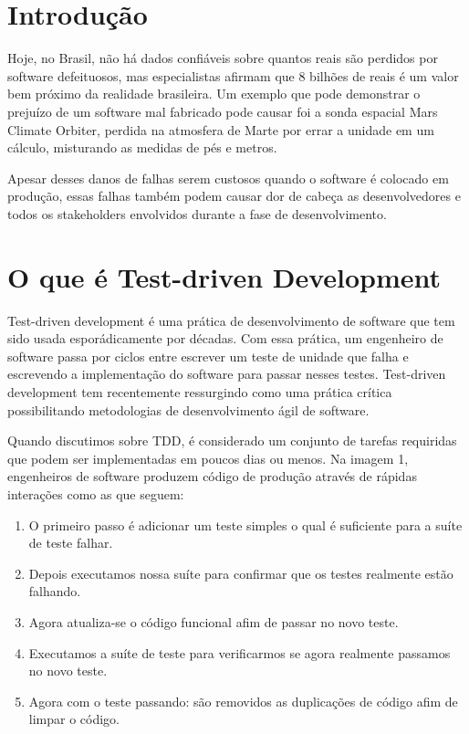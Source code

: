 \documentclass[12pt]{article}
\begin{document}
  \clearpage

  \renewcommand*\contentsname{Sumário}

  \tableofcontents

  \clearpage

  \section{Introdução}

  Hoje, no Brasil, não há dados confiáveis sobre quantos reais são perdidos por
  software defeituosos, mas especialistas afirmam que 8 bilhões de reais é um
  valor bem próximo da realidade brasileira. Um exemplo que pode demonstrar o 
  prejuízo de um software mal fabricado pode causar foi a sonda espacial Mars 
  Climate Orbiter, perdida na atmosfera de Marte por errar a unidade em um
  cálculo, misturando as medidas de pés e metros.

  Apesar desses danos de falhas serem custosos quando o software é colocado em
  produção, essas falhas também podem causar dor de cabeça as desenvolvedores e
  todos os stakeholders envolvidos durante a fase de desenvolvimento.

  \section{O que é Test-driven Development}

  Test-driven development é uma prática de desenvolvimento de software que tem 
  sido usada esporádicamente por décadas. Com essa prática, um engenheiro de 
  software passa por ciclos entre escrever um teste de unidade que falha e 
  escrevendo a implementação do software para passar nesses testes. 
  Test-driven development tem recentemente ressurgindo como uma prática crítica 
  possibilitando metodologias de desenvolvimento ágil de software.

  Quando discutimos sobre TDD, é considerado um conjunto de tarefas requiridas 
  que podem ser implementadas em poucos dias ou menos. Na imagem 1, engenheiros 
  de software produzem código de produção através de rápidas interações como as 
  que seguem:

  \begin{enumerate}
    \item O primeiro passo é adicionar um teste simples o qual é suficiente 
    para a suíte de teste falhar.
    \item Depois executamos nossa suíte para confirmar que os testes realmente 
    estão falhando.
    \item Agora atualiza-se o código funcional afim de passar no novo teste.
    \item Executamos a suíte de teste para verificarmos se agora realmente 
    passamos no novo teste.
    \item Agora com o teste passando: são removidos as duplicações de código 
    afim de limpar o código.
  \end{enumerate}
\end{document}
